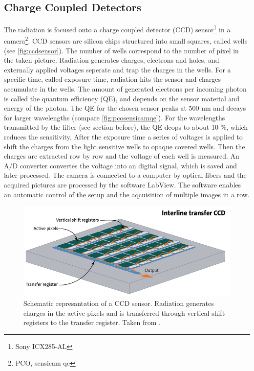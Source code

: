\subsection{Charge Coupled Detectors}
The radiation is focused onto a charge coupled detector (CCD) sensor\footnote{Sony ICX285-AL} in a camera\footnote{PCO, sensicam qe}. CCD sensors are silicon chips structured into small squares, called wells \cite{SchnellCCD1993}(see \autoref{fig:ccdsensor}). The number of wells correspond to the number of pixel in the taken picture. Radiation generates charges, electrons and holes, and externally applied voltages seperate and trap the charges in the wells. For a specific time, called exposure time, radiation hits the sensor and charges accumulate in the wells. The amount of generated electrons per incoming photon is called the quantum efficiency (QE), and depends on the sensor material and energy of the photon. The QE for the chosen sensor peaks at 500 nm and decays for larger wavelengths (compare \autoref{fig:pcosensicamqe}). For the wavelengths transmitted by the filter (see section before), the QE deops to about 10 \%, which reduces the sensitivity. After the exposure time a series of voltages is applied to shift the charges from the light sensitive wells to opaque covered wells. Then the charges are extracted row by row and the voltage of each well is measured. An A/D converter convertes the voltage into an digital signal, which is saved and later processed. The camera is connected to a computer by optical fibers and the acquired pictures are processed by the software LabView. The software enables an automatic control of the setup and the aqcuisition of multiple images in a row.
\begin{figure}
	\centering
	\includegraphics[width=\linewidth]{Images/ExperimentalSetup/ccd-sensor-interline-transfer-en}
	\caption{Schematic represantation of a CCD sensor. Radiation generates charges in the active pixels and is transferred through vertical shift registers to the transfer register. Taken from \cite{StemmerCCD}.}
	\label{fig:ccdsensor}
\end{figure}


